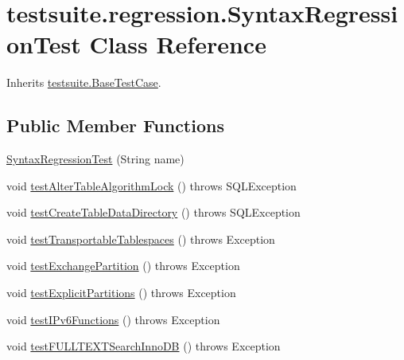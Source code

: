 \hypertarget{classtestsuite_1_1regression_1_1_syntax_regression_test}{}\section{testsuite.\+regression.\+Syntax\+Regression\+Test Class Reference}
\label{classtestsuite_1_1regression_1_1_syntax_regression_test}


Inherits \mbox{\hyperlink{classtestsuite_1_1_base_test_case}{testsuite.\+Base\+Test\+Case}}.

\subsection*{Public Member Functions}
\begin{DoxyCompactItemize}
\item 
\mbox{\hyperlink{classtestsuite_1_1regression_1_1_syntax_regression_test_a55470891999b68b586366e1eef322aab}{Syntax\+Regression\+Test}} (String name)
\item 
void \mbox{\hyperlink{classtestsuite_1_1regression_1_1_syntax_regression_test_ad8db7c4293c435d564218db929d2d30d}{test\+Alter\+Table\+Algorithm\+Lock}} ()  throws S\+Q\+L\+Exception 
\item 
void \mbox{\hyperlink{classtestsuite_1_1regression_1_1_syntax_regression_test_a5e613256d2f2d7d6fbd6144c8b050670}{test\+Create\+Table\+Data\+Directory}} ()  throws S\+Q\+L\+Exception 
\item 
void \mbox{\hyperlink{classtestsuite_1_1regression_1_1_syntax_regression_test_a947576b5790653a73ac1cf0185c76fdd}{test\+Transportable\+Tablespaces}} ()  throws Exception 
\item 
void \mbox{\hyperlink{classtestsuite_1_1regression_1_1_syntax_regression_test_a27af4a565f65e6f33db3e05e87a2035a}{test\+Exchange\+Partition}} ()  throws Exception 
\item 
void \mbox{\hyperlink{classtestsuite_1_1regression_1_1_syntax_regression_test_a4aacde39fa83ec7ba0436c5eb372a98d}{test\+Explicit\+Partitions}} ()  throws Exception 
\item 
void \mbox{\hyperlink{classtestsuite_1_1regression_1_1_syntax_regression_test_af681c26981536cc82b5c316136ec34ea}{test\+I\+Pv6\+Functions}} ()  throws Exception 
\item 
void \mbox{\hyperlink{classtestsuite_1_1regression_1_1_syntax_regression_test_ab17b59b494fc9088d01ed9da04095161}{test\+F\+U\+L\+L\+T\+E\+X\+T\+Search\+Inno\+DB}} ()  throws Exception 

\end{DoxyCompactItemize}
